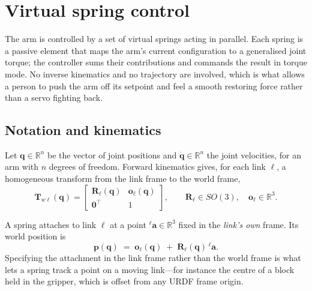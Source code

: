 %
%

\section{Virtual spring control}
\label{sec:spring-math}

The arm is controlled by a set of virtual springs acting in parallel. Each
spring is a passive element that maps the arm's current configuration to a
generalised joint torque; the controller sums their contributions and commands
the result in torque mode. No inverse kinematics and no trajectory are
involved, which is what allows a person to push the arm off its setpoint and
feel a smooth restoring force rather than a servo fighting back.

\subsection{Notation and kinematics}
\label{sec:notation}

Let $\bm{q} \in \mathbb{R}^{n}$ be the vector of joint positions and
$\dot{\bm{q}} \in \mathbb{R}^{n}$ the joint velocities, for an arm with $n$
degrees of freedom. Forward kinematics gives, for each link $\ell$, a
homogeneous transform from the link frame to the world frame,
%
\begin{equation}
  \bm{T}_{w\ell}(\bm{q}) =
  \begin{bmatrix}
    \bm{R}_{\ell}(\bm{q}) & \bm{o}_{\ell}(\bm{q}) \\
    \bm{0}^{\top} & 1
  \end{bmatrix},
  \qquad
  \bm{R}_{\ell} \in SO(3), \quad \bm{o}_{\ell} \in \mathbb{R}^{3}.
\end{equation}

A spring attaches to link $\ell$ at a point ${}^{\ell}\bm{a} \in \mathbb{R}^{3}$
fixed in the \emph{link's own} frame. Its world position is
%
\begin{equation}
  \bm{p}(\bm{q}) \;=\; \bm{o}_{\ell}(\bm{q}) \;+\; \bm{R}_{\ell}(\bm{q})\,
  {}^{\ell}\bm{a}.
  \label{eq:attachment-point}
\end{equation}
%
Specifying the attachment in the link frame rather than the world frame is what
lets a spring track a point on a moving link---for instance the centre of a
block held in the gripper, which is offset from any URDF frame origin.

